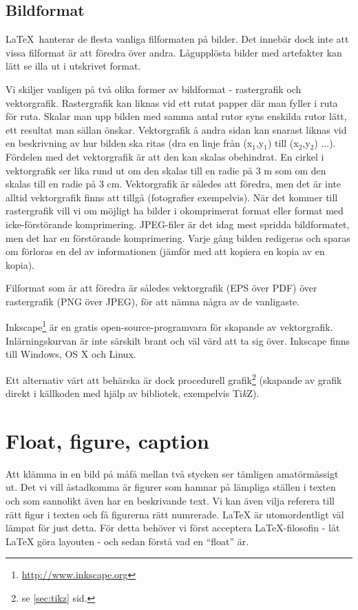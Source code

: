 \subsection{Bildformat}
\LaTeX\ hanterar de flesta vanliga filformaten på bilder. Det innebär dock inte att vissa filformat är att föredra över andra. Lågupplösta bilder med artefakter kan lätt se illa ut i utskrivet format.

Vi skiljer vanligen på två olika former av bildformat - rastergrafik och vektorgrafik. Rastergrafik kan liknas vid ett rutat papper där man fyller i ruta för ruta. Skalar man upp bilden med samma antal rutor syns enskilda rutor lätt, ett resultat man sällan önskar. Vektorgrafik å andra sidan kan snarast liknas vid en beskrivning av hur bilden ska ritas (dra en linje från (x$_1$,y$_1$) till (x$_2$,y$_2$) ...). Fördelen med det vektorgrafik är att den kan skalas obehindrat. En cirkel i vektorgrafik ser lika rund ut om den skalas till en radie på 3 m som om den skalas till en radie på 3 cm. Vektorgrafik är således att föredra, men det är inte alltid vektorgrafik finns att tillgå (fotografier exempelvis).
När det kommer till rastergrafik vill vi om möjligt ha bilder i okomprimerat format eller format med icke-förstörande komprimering. JPEG-filer är det idag mest spridda bildformatet, men det har en förstörande komprimering. Varje gång bilden redigeras och sparas om förloras en del av informationen (jämför med att kopiera en kopia av en kopia). 

Filformat som är att föredra är således vektorgrafik (EPS över PDF) över rastergrafik (PNG över JPEG), för att nämna några av de vanligaste.

Inkscape\footnote{\url{http://www.inkscape.org}} är en gratis open-source-programvara för skapande av vektorgrafik. Inlärningskurvan är inte särskilt brant och väl värd att ta sig över. Inkscape finns till Windows, OS X och Linux.

\newcommand{\TikZ}{Ti\emph{k}Z}
Ett alternativ värt att behärska är dock procedurell grafik\footnote{se \ref{sec:tikz} sid. \pageref{sec:tikz}} (skapande av grafik direkt i källkoden med hjälp av bibliotek, exempelvis \TikZ).

\section{Float, figure, caption}\label{sec:floats}
Att klämma in en bild på måfå mellan två stycken ser tämligen amatörmässigt ut. Det vi vill åstadkomma är figurer som hamnar på lämpliga ställen i texten och som sannolikt även har en beskrivande text. Vi kan även vilja referera till rätt figur i texten och få figurerna rätt numrerade. \LaTeX{} är utomordentligt väl lämpat för just detta. För detta behöver vi först acceptera \LaTeX{}-filosofin - låt \LaTeX{} göra layouten - och sedan förstå vad en ``float'' är.

